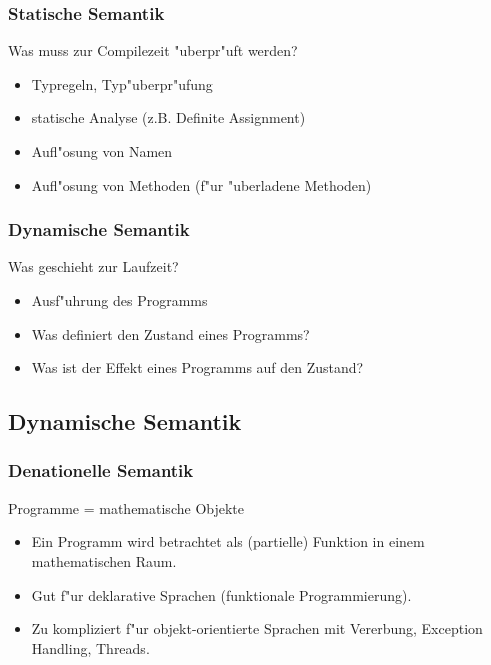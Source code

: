 \documentclass[german,10pt, a4paper, twocolumn]{scrartcl}
\theoremstyle{definition}
\theoremstyle{remark}
\begin{document}
\subsubsection{Statische Semantik}

Was muss zur Compilezeit "uberpr"uft werden?

\begin{itemize}
	\item Typregeln, Typ"uberpr"ufung
	\item statische Analyse (z.B. Definite Assignment)
	\item Aufl"osung von Namen
	\item Aufl"osung von Methoden (f"ur "uberladene Methoden)
\end{itemize}

\subsubsection{Dynamische Semantik}

Was geschieht zur Laufzeit?
\begin{itemize}
	\item Ausf"uhrung des Programms
	\item Was definiert den Zustand eines Programms?
	\item Was ist der Effekt eines Programms auf den Zustand?
\end{itemize}

\subsection{Dynamische Semantik}

\subsubsection{Denationelle Semantik}

Programme = mathematische Objekte\\

\begin{itemize}
	\item Ein Programm wird betrachtet als (partielle) Funktion in einem mathematischen Raum.
	\item Gut f"ur deklarative Sprachen (funktionale Programmierung).
	\item Zu kompliziert f"ur objekt-orientierte Sprachen mit Vererbung, Exception Handling, Threads.
\end{itemize}
\end{document}
